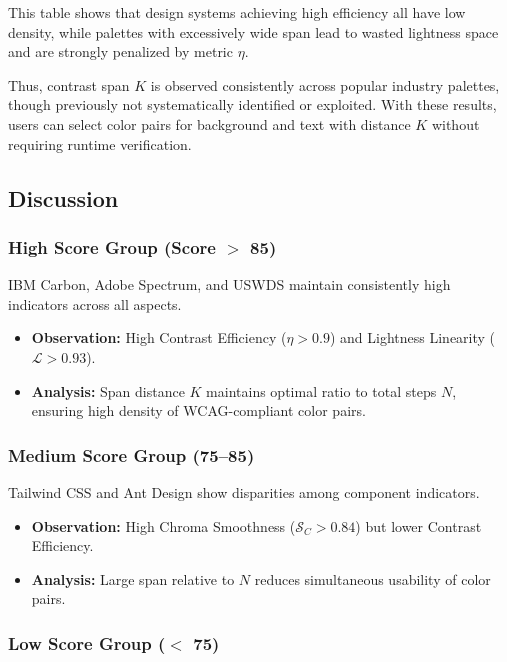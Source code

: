This table shows that design systems achieving high efficiency all have low
density, while palettes with excessively wide span lead to wasted lightness
space and are strongly penalized by metric $\eta$.

Thus, contrast span $K$ is observed consistently across popular industry
palettes, though previously not systematically identified or exploited. With
these results, users can select color pairs for background and text with
distance $K$ without requiring runtime verification.

\subsection{Discussion}

\subsubsection{High Score Group (Score $>$ 85)}

IBM Carbon, Adobe Spectrum, and USWDS maintain consistently high indicators
across all aspects.
\begin{itemize}
\item \textbf{Observation:} High Contrast Efficiency ($\eta > 0.9$) and
Lightness Linearity ($\mathcal{L} > 0.93$).
\item \textbf{Analysis:} Span distance $K$ maintains optimal ratio to total
steps $N$, ensuring high density of WCAG-compliant color pairs.
\end{itemize}

\subsubsection{Medium Score Group (75--85)}

Tailwind CSS and Ant Design show disparities among component indicators.
\begin{itemize}
\item \textbf{Observation:} High Chroma Smoothness
($\mathcal{S}_C > 0.84$) but lower Contrast Efficiency.
\item \textbf{Analysis:} Large span relative to $N$ reduces simultaneous
usability of color pairs.
\end{itemize}

\subsubsection{Low Score Group ($<$ 75)}

